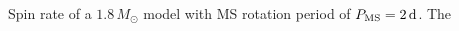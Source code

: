  \label{fig:MRI1.8rot} Spin rate of a $1.8 \, M_\odot$ model with MS rotation period of $P_{\rm MS} = 2 \, {\rm d}$. The 